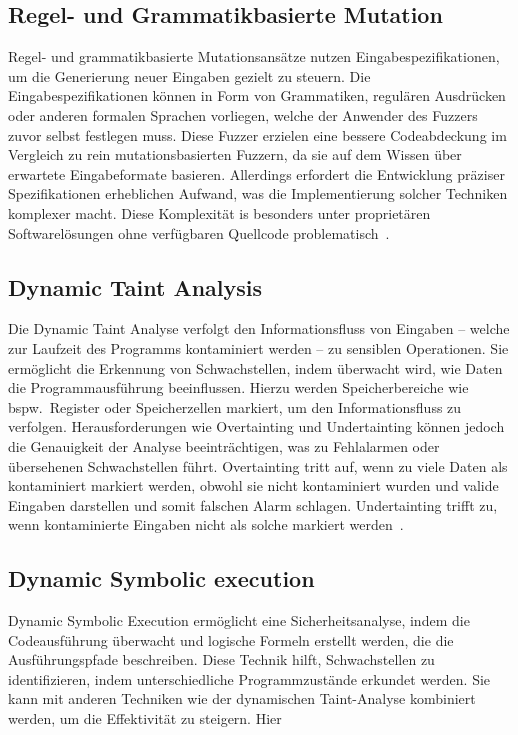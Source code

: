 \subsection{Regel- und Grammatikbasierte Mutation}\label{subsec:regelbasierte-muataion-und-grammatik}
Regel- und grammatikbasierte Mutationsansätze nutzen Eingabespezifikationen, um die Generierung neuer Eingaben gezielt
zu steuern.
Die Eingabespezifikationen können in Form von Grammatiken, regulären Ausdrücken oder anderen formalen Sprachen vorliegen,
welche der Anwender des Fuzzers zuvor selbst festlegen muss.
Diese Fuzzer erzielen eine bessere Codeabdeckung im Vergleich zu rein mutationsbasierten Fuzzern, da sie auf dem Wissen
über erwartete Eingabeformate basieren.
Allerdings erfordert die Entwicklung präziser Spezifikationen erheblichen Aufwand, was die Implementierung solcher Techniken
komplexer macht.
Diese Komplexität is besonders unter proprietären Softwarelösungen ohne verfügbaren Quellcode problematisch~\cite{eceiza_fuzzing_2021}.
\subsection{Dynamic Taint Analysis}\label{subsec:dynamic-taint-analysis}
Die Dynamic Taint Analyse verfolgt den Informationsfluss von Eingaben -- welche zur Laufzeit des Programms kontaminiert
werden -- zu sensiblen Operationen.
Sie ermöglicht die Erkennung von Schwachstellen, indem überwacht wird, wie Daten die Programmausführung beeinflussen.
Hierzu werden Speicherbereiche wie bspw.\ Register oder Speicherzellen markiert, um den Informationsfluss zu verfolgen.
Herausforderungen wie Overtainting und Undertainting können jedoch die Genauigkeit der Analyse beeinträchtigen, was zu
Fehlalarmen oder übersehenen Schwachstellen führt.
Overtainting tritt auf, wenn zu viele Daten als kontaminiert markiert werden, obwohl sie nicht kontaminiert wurden und
valide Eingaben darstellen und somit falschen Alarm schlagen.
Undertainting trifft zu, wenn kontaminierte Eingaben nicht als solche markiert werden~\cite{schwartz_all_2010}.
\subsection{Dynamic Symbolic execution}\label{subsec:dynamic-symbolic-execution}
Dynamic Symbolic Execution ermöglicht eine Sicherheitsanalyse, indem die Codeausführung überwacht und logische Formeln
erstellt werden, die die Ausführungspfade beschreiben.
Diese Technik hilft, Schwachstellen zu identifizieren, indem unterschiedliche Programmzustände erkundet werden.
Sie kann mit anderen Techniken wie der dynamischen Taint-Analyse kombiniert werden, um die Effektivität zu steigern.
Hier~\cite{schwartz_all_2010}
